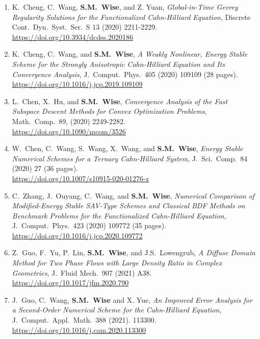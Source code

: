 \documentclass[11pt]{letter}
\begin{document}
\begin{enumerate}
	\item
K.~Cheng, C.~Wang, \textbf{S.M.~Wise}, and Z. Yuan, {\sl Global-in-Time Gevrey Regularity Solutions for the Functionalized Cahn-Hilliard Equation}, Discrete Cont.~Dyn.~Syst.~Ser.~S 13 (2020) 2211-2229.
	\\ 
\url{https://doi.org/10.3934/dcdss.2020186}

	\item
K.~Cheng, C.~Wang, and \textbf{S.M.~Wise}, {\sl A Weakly Nonlinear, Energy Stable Scheme for the Strongly Anisotropic Cahn-Hilliard Equation and Its Convergence Analysis}, J.~Comput.~Phys.~405 (2020) 109109 (28 pages).
	\\ 
\url{https://doi.org/10.1016/j.jcp.2019.109109}

	\item
L.~Chen, X.~Hu, and \textbf{S.M.~Wise}, {\sl Convergence Analysis of the Fast Subspace Descent Methods for Convex Optimization Problems}, Math.~Comp.~89, (2020) 2249-2282.
	\\ 
\url{https://doi.org/10.1090/mcom/3526}

	\item
W.~Chen, C.~Wang, S.~Wang, X.~Wang, and \textbf{S.M.~Wise}, {\sl Energy Stable Numerical Schemes for a Ternary Cahn-Hilliard System}, J.~Sci.~Comp.~84 (2020) 27 (36 pages).
	\\ 
\url{https://doi.org/10.1007/s10915-020-01276-z}

	\item
C.~Zhang, J.~Ouyang, C.~Wang, and \textbf{S.M.~Wise}, {\sl Numerical Comparison of Modified-Energy Stable SAV-Type Schemes and Classical BDF Methods on Benchmark Problems for the Functionalized Cahn-Hilliard Equation}, J.~Comput.~Phys.~423 (2020) 109772 (35 pages).
	\\ 
\url{https://doi.org/10.1016/j.jcp.2020.109772}

	\item
Z.~Guo, F.~Yu,  P.~Lin, \textbf{S.M.~Wise}, and J.S.~Lowengrub, {\sl A Diffuse Domain Method for Two Phase Flows with Large Density Ratio in Complex Geometries}, J.~Fluid Mech.~907 (2021) A38.
	\\
\url{https://doi.org/10.1017/jfm.2020.790}

	\item
J.~Guo, C.~Wang, \textbf{S.M.~Wise} and X. Yue, {\sl An Improved Error Analysis for a Second-Order Numerical Scheme for the Cahn-Hilliard Equation}, J.~Comput.~Appl.~Math.~388 (2021). 113300.
	\\
\url{https://doi.org/10.1016/j.cam.2020.113300}


\end{enumerate}
\end{document}
